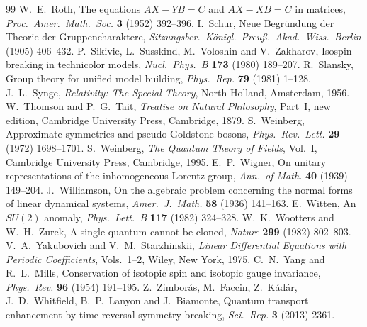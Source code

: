 \begin{thebibliography}{99}
 W.~E.~Roth, The equations $AX-YB=C$ and $AX-XB=C$ in matrices, \emph{Proc.\ Amer.\ Math.\ Soc.} \textbf{3} (1952) 392--396.
 I.~Schur, Neue Begr\"undung der Theorie der Gruppencharaktere, \emph{Sitzungsber.\ K\"onigl.\ Preu\ss.\ Akad.\ Wiss.\ Berlin} (1905) 406--432.
 P.~Sikivie, L.~Susskind, M.~Voloshin and V.~Zakharov, Isospin breaking in technicolor models, \emph{Nucl.\ Phys.\ B} \textbf{173} (1980) 189--207.
 R.~Slansky, Group theory for unified model building, \emph{Phys.\ Rep.} \textbf{79} (1981) 1--128.
 J.~L.~Synge, \emph{Relativity: The Special Theory}, North-Holland, Amsterdam, 1956.
 W.~Thomson and P.~G.~Tait, \emph{Treatise on Natural Philosophy}, Part~I, new edition, Cambridge University Press, Cambridge, 1879.
 S.~Weinberg, Approximate symmetries and pseudo-Goldstone bosons, \emph{Phys.\ Rev.\ Lett.} \textbf{29} (1972) 1698--1701.
 S.~Weinberg, \emph{The Quantum Theory of Fields}, Vol.~I, Cambridge University Press, Cambridge, 1995.
 E.~P.~Wigner, On unitary representations of the inhomogeneous Lorentz group, \emph{Ann.\ of Math.} \textbf{40} (1939) 149--204.
 J.~Williamson, On the algebraic problem concerning the normal forms of linear dynamical systems, \emph{Amer.\ J.\ Math.} \textbf{58} (1936) 141--163.
 E.~Witten, An $SU(2)$ anomaly, \emph{Phys.\ Lett.\ B} \textbf{117} (1982) 324--328.
 W.~K.~Wootters and W.~H.~Zurek, A single quantum cannot be cloned, \emph{Nature} \textbf{299} (1982) 802--803.
 V.~A.~Yakubovich and V.~M.~Starzhinskii, \emph{Linear Differential Equations with Periodic Coefficients}, Vols.~1--2, Wiley, New York, 1975.
 C.~N.~Yang and R.~L.~Mills, Conservation of isotopic spin and isotopic gauge invariance, \emph{Phys.\ Rev.} \textbf{96} (1954) 191--195.
 Z.~Zimbor\'as, M.~Faccin, Z.~K\'ad\'ar, J.~D.~Whitfield, B.~P.~Lanyon and J.~Biamonte, Quantum transport enhancement by time-reversal symmetry breaking, \emph{Sci.\ Rep.} \textbf{3} (2013) 2361.
\end{thebibliography}
